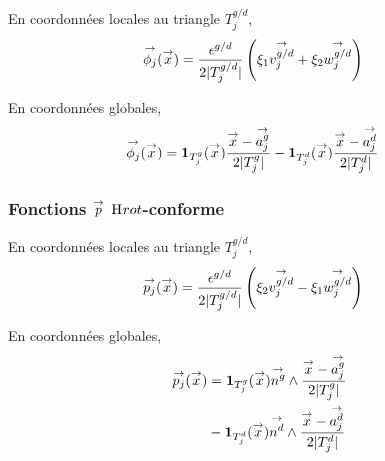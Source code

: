       \begin{minipage}{0.45\textwidth}
          \begin{center}
            \begin{tikzpicture}[scale=1]
              
            \end{tikzpicture}
          \end{center}
          \label{fig:form_int:fon_base:phi}
      \end{minipage} 
      \begin{minipage}{0.54\textwidth}
        En coordonnées locales au triangle \(T_j^{g/d}\),
        \begin{align*}
         \phij(\vx) &= \frac{\epsilon^{g/d}}{2|T_j^{g/d}|}\left(\xi_1 \vect{v_j^{g/d}} + \xi_2 \vect{w_j^{g/d}}\right)
        \end{align*}

        En coordonnées globales,
        \begin{align*}
          \phij(\vx) &= \mathbf{1}_{T_j^g}(\vx)\frac{\vx-\vect{a_j^g}}{2|T_j^g|} - \mathbf{1}_{T_j^d}(\vx)\frac{\vx-\vect{a_j^d}}{2|T_j^d|}
        \end{align*}
      \end{minipage}

    \subsubsection[Fonctions p Hcurl-conforme]{Fonctions \(\vect{p}\) \(\Hrot\)-conforme}

      \begin{minipage}{0.45\textwidth}
        \begin{center}
          \begin{tikzpicture}[scale=1]
            
          \end{tikzpicture}
        \end{center}
        \label{fig:form_int:fon_base:p}
      \end{minipage} 
      \begin{minipage}{0.54\textwidth}
        En coordonnées locales au triangle \(T_j^{g/d}\),
        \begin{align*}
          \pj(\vx) &= \frac{\epsilon^{g/d}}{2|T_j^{g/d}|}\left(\xi_2 \vect{v_j^{g/d}}-\xi_1 \vect{w_j^{g/d}}\right)
        \end{align*}

        En coordonnées globales,
        \begin{align*}
          \pj(\vx) 
          &= \mathbf{1}_{T_j^g}(\vx)\vect{n^g} \pvect \frac{\vx-\vect{a_j^g}}{2|T_j^g|} \\
          &- \mathbf{1}_{T_j^d}(\vx)\vect{n^d} \pvect \frac{\vx-\vect{a_j^d}}{2|T_j^d|}
        \end{align*}
      \end{minipage}


